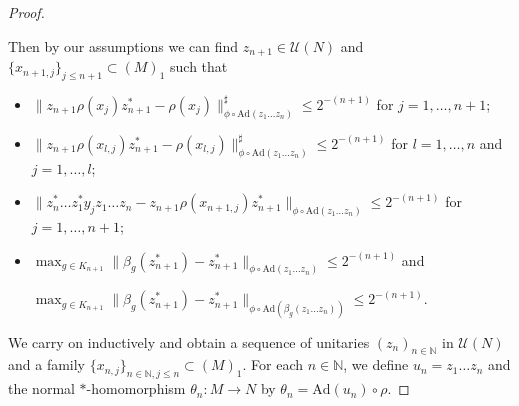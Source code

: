 \documentclass[11pt,a4paper]{article}
\theoremstyle{definition}
\theoremstyle{remark}
\numberwithin{equation}{section}
\numberwithin{theorem}{section}
\newcommand{\N}{\mathbb{N}}
\begin{document}
\begin{proof}
\begin{enumerate}
\label{eq:approximate_fixedness}
\end{enumerate}
Then by our assumptions we can find $z_{n+1} \in \mathcal{U}(N)$ and $\{x_{n+1,j}\}_{j \leq n+1}\subset (M)_1$ such that
\begin{itemize}
\item $\|z_{n+1} \rho(x_j)z_{n+1}^* - \rho(x_j)\|^\sharp_{\phi \circ \mathrm{Ad}(z_1 \hdots z_n)} \leq 2^{-(n+1)}$ for $j= 1, \hdots, n+1$;
\item $\|z_{n+1} \rho(x_{l,j})z_{n+1}^* - \rho(x_{l,j})\|^\sharp_{\phi \circ \mathrm{Ad}(z_1 \hdots z_n)} \leq 2^{-(n+1)}$ for $l=1, \hdots, n$ and $j = 1, \hdots, l$;
\item $ \|z_{n}^* \hdots z_1^*y_jz_1 \hdots z_{n} - z_{n+1}\rho(x_{n+1,j})z_{n+1}^*\|_{\phi \circ \mathrm{Ad}(z_1 \hdots z_n)} \leq 2^{-(n+1)}$ for $j=1, \hdots, n+1$;
\item $\max_{g \in K_{n+1}} \|\beta_g(z_{n+1}^*)- z_{n+1}^*\|_{\phi \circ \mathrm{Ad}(z_1 \hdots z_n)} \leq 2^{-(n+1)}$ and

$\max_{g \in K_{n+1}} \|\beta_g(z_{n+1}^*)- z_{n+1}^*\|_{\phi \circ \mathrm{Ad}(\beta_g(z_1 \hdots z_n))} \leq 2^{-(n+1)}$. 
\end{itemize}
We carry on inductively and obtain a sequence of unitaries $(z_n)_{n \in \N}$ in $\mathcal{U}(N)$ and a family $\{ x_{n,j} \}_{n\in\N, j\leq n}\subset (M)_1$.
For each $n \in \N$, we define $u_n=z_1 \hdots z_n$ and the normal $*$-homomorphism ${\theta_n\colon M \rightarrow N}$ by $\theta_n = \mathrm{Ad}(u_n) \circ \rho$.


\end{proof}
\end{document}
